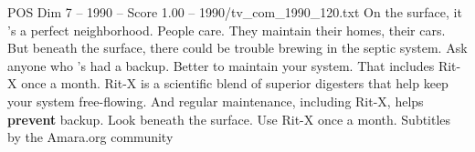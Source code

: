 \begin{textsample}{POS Dim 7 – 1990 – Score 1.00 – 1990/tv\_com\_1990\_120.txt}  \label{ex:f7_pos_070}
On the surface, it 's a perfect neighborhood.
People care.
They maintain their homes, their cars.
But beneath the surface, there could be trouble brewing in the septic system.
Ask anyone who 's had a backup.
Better to maintain your system.
That includes Rit-X once a month.
Rit-X is a scientific blend of superior digesters that help keep your system free-flowing.
And regular maintenance, including Rit-X, helps \textbf{prevent} backup.
Look beneath the surface.
Use Rit-X once a month.
Subtitles by the Amara.org community

\end{textsample}
